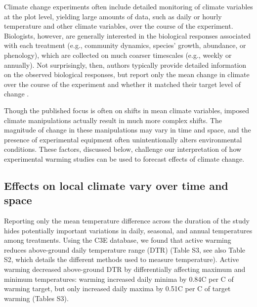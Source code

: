 \documentclass{article}
\begin{document}
Climate change experiments often include detailed monitoring of climate variables at the plot level, yielding large amounts of data, such as daily or hourly temperature and other climate variables, over the course of the experiment. Biologists, however, are generally interested in the biological responses associated with each treatment (e.g., community dynamics, species' growth, abundance, or phenology), which are collected on much coarser timescales (e.g., weekly or annually). Not surprisingly, then, authors typically provide detailed information on the observed biological responses, but report only the mean change in climate over the course of the experiment and whether it matched their target level of change \citep[e.g.,][]{price1998,clark2014a,clark2014b,rollinson2012}. 

\par Though the published focus is often on shifts in mean climate variables, imposed climate manipulations actually result in much more complex shifts. The magnitude of change in these manipulations may vary in time and space, and the presence of experimental equipment often unintentionally alters environmental conditions. These factors, discussed below, challenge our interpretation of how experimental warming studies can be used to forecast effects of climate change.

\subsection* {Effects on local climate vary over time and space}
Reporting only the mean temperature difference across the duration of the study hides potentially important variations in daily, seasonal, and annual temperatures among treatments. Using the C3E database, we found that active warming reduces above-ground daily temperature range (DTR) (Table S3, see also Table S2, which details the different methods used to measure temperature). Active warming decreased above-ground DTR by differentially affecting maximum and minimum temperatures: warming increased daily minima by 0.84\degree C per \degree C of warming target, but only increased daily maxima by 0.51\degree C per \degree C of target warming (Tables S3). %
\end{document}

